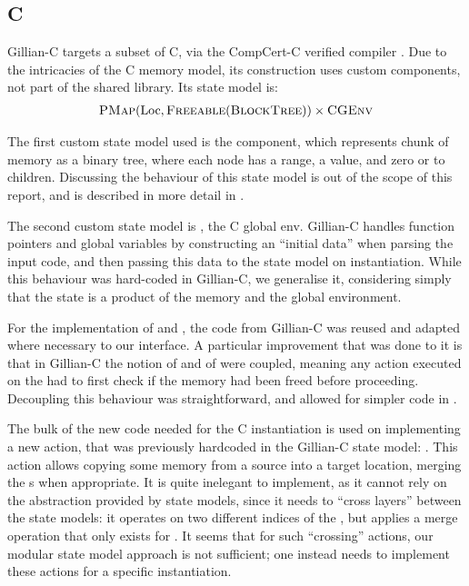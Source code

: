 \subsection{C}

Gillian-C \cite{gillian0} targets a subset of C, via the CompCert-C verified compiler \cite{compcert}. Due to the intricacies of the C memory model, its construction uses custom components, not part of the shared library. Its state model is: \begin{align*}
	\textsc{PMap}(\text{Loc}, \textsc{Freeable}(\textsc{BlockTree})) \times \textsc{CGEnv}
\end{align*}

The first custom state model used is the \BlockTree{} component, which represents chunk of memory as a binary tree, where each node has a range, a value, and zero or to children. Discussing the behaviour of this state model is out of the scope of this report, and is described in more detail in \cite{sacha-phd}.

The second custom state model is \CGEnv{}, the C global env. Gillian-C handles function pointers and global variables by constructing an ``initial data'' when parsing the input code, and then passing this data to the state model on instantiation. While this behaviour was hard-coded in Gillian-C, we generalise it, considering simply that the state is a product of the memory and the global environment.

For the implementation of \BlockTree{} and \CGEnv, the code from Gillian-C was reused and adapted where necessary to our interface. A particular improvement that was done to it is that in Gillian-C the notion of \Freeable{} and of \BlockTree{} were coupled, meaning any action executed on the \BlockTree{} had to first check if the memory had been freed before proceeding. Decoupling this behaviour was straightforward, and allowed for simpler code in \BlockTree.

The bulk of the new code needed for the C instantiation is used on implementing a new action, that was previously hardcoded in the Gillian-C state model: . This action allows copying some memory from a source into a target location, merging the \BlockTree{}s when appropriate. It is quite inelegant to implement, as it cannot rely on the abstraction provided by state models, since it needs to ``cross layers'' between the state models: it operates on two different indices of the \PMap, but applies a merge operation that only exists for \BlockTree. It seems that for such ``crossing'' actions, our modular state model approach is not sufficient; one instead needs to implement these actions for a specific instantiation.

